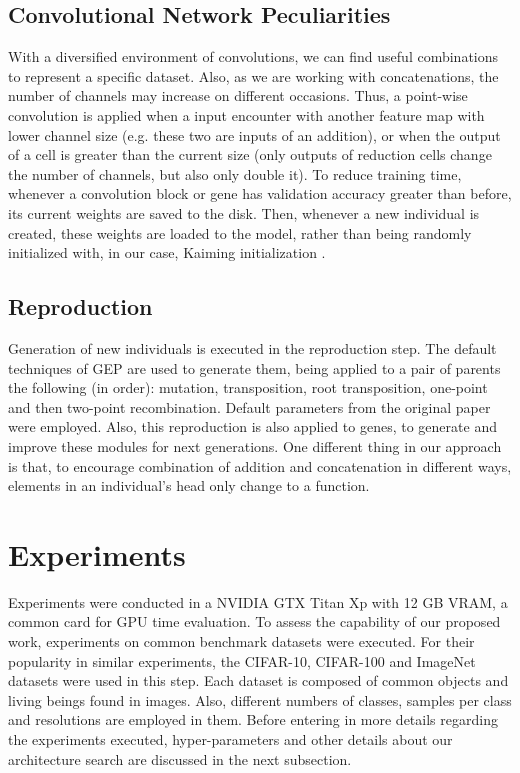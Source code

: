 \documentclass[conference]{IEEEtran}
\begin{document}
	\subsection{Convolutional Network Peculiarities}
	
	With a diversified environment of convolutions, we can find useful combinations to represent a specific dataset.
	Also, as we are working with concatenations, the number of channels may increase on different occasions.
	Thus, a point-wise convolution is applied when a input encounter with another feature map with lower channel size (e.g. these two are inputs of an addition), or when the output of a cell is greater than the current size (only outputs of reduction cells change the number of channels, but also only double it).
	To reduce training time, whenever a convolution block or gene has validation accuracy greater than before, its current weights are saved to the disk.
	Then, whenever a new individual is created, these weights are loaded to the model, rather than being randomly initialized with, in our case, Kaiming initialization \cite{he2015delving}.
	
	\subsection{Reproduction}
	
	Generation of new individuals is executed in the reproduction step.
	The default techniques of GEP are used to generate them, being applied to a pair of parents the following (in order): mutation, transposition, root transposition, one-point and then two-point recombination.
	Default parameters from the original paper were employed.
	Also, this reproduction is also applied to genes, to generate and improve these modules for next generations.   
	One different thing in our approach is that, to encourage combination of addition and concatenation in different ways, elements in an individual's head only change to a function.
	
	\section{Experiments}
	
	Experiments were conducted in a NVIDIA GTX Titan Xp with 12 GB VRAM, a common card for GPU time evaluation.
	To assess the capability of our proposed work, experiments on common benchmark datasets were executed. 
	For their popularity in similar experiments, the CIFAR-10, CIFAR-100 and ImageNet datasets were used in this step.
	Each dataset is composed of common objects and living beings found in images.
	Also, different numbers of classes, samples per class and resolutions are employed in them.
	Before entering in more details regarding the experiments executed, hyper-parameters and other details about our architecture search are discussed in the next subsection. 
	
\end{document}

